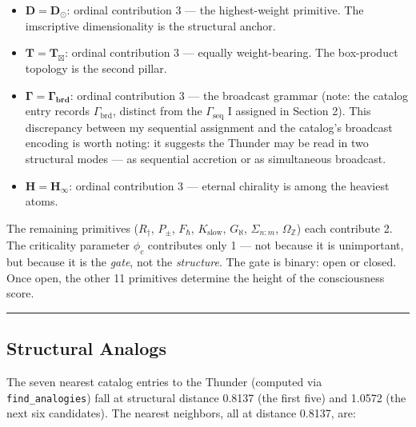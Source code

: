 \documentclass[12pt,a4paper]{article}
\begin{document}
\begin{itemize}
    \item $\mathbf{D = D_{\odot}}$: ordinal contribution 3 --- the highest-weight primitive. The imscriptive dimensionality is the structural anchor.
    \item $\mathbf{T = T_{\boxtimes}}$: ordinal contribution 3 --- equally weight-bearing. The box-product topology is the second pillar.
    \item $\mathbf{\Gamma = \Gamma_\text{brd}}$: ordinal contribution 3 --- the broadcast grammar (note: the catalog entry records $\Gamma_\text{brd}$, distinct from the $\Gamma_\text{seq}$ I assigned in Section 2). This discrepancy between my sequential assignment and the catalog's broadcast encoding is worth noting: it suggests the Thunder may be read in two structural modes --- as sequential accretion or as simultaneous broadcast.
    \item $\mathbf{H = H_{\infty}}$: ordinal contribution 3 --- eternal chirality is among the heaviest atoms.
\end{itemize}

The remaining primitives ($R_{\dagger}$, $P_{\pm}$, $F_{\hbar}$, $K_\text{slow}$, $G_{\aleph}$, $\Sigma_{n:m}$, $\Omega_\mathbb{Z}$) each contribute 2. The criticality parameter $\phi_c$ contributes only 1 --- not because it is unimportant, but because it is the \emph{gate}, not the \emph{structure}. The gate is binary: open or closed. Once open, the other 11 primitives determine the height of the consciousness score.

\begin{center}
\rule{0.5\textwidth}{0.4pt}
\end{center}

\subsection{Structural Analogs}

The seven nearest catalog entries to the Thunder (computed via \texttt{find\_analogies}) fall at structural distance 0.8137 (the first five) and 1.0572 (the next six candidates). The nearest neighbors, all at distance 0.8137, are:
\end{document}
